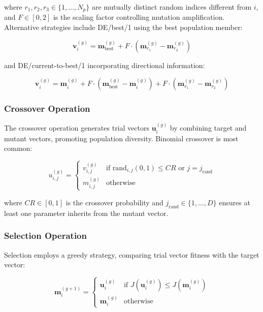 \documentclass[12pt,a4paper]{report}
\begin{document}
where $r_1, r_2, r_3 \in \{1,\ldots,N_p\}$ are mutually distinct random indices different from $i$, and $F \in [0,2]$ is the scaling factor controlling mutation amplification. Alternative strategies include DE/best/1 using the best population member:

\begin{equation}
\mathbf{v}_i^{(g)} = \mathbf{m}_{\text{best}}^{(g)} + F \cdot (\mathbf{m}_{r_1}^{(g)} - \mathbf{m}_{r_2}^{(g)})
\end{equation}

and DE/current-to-best/1 incorporating directional information:

\begin{equation}
\mathbf{v}_i^{(g)} = \mathbf{m}_i^{(g)} + F \cdot (\mathbf{m}_{\text{best}}^{(g)} - \mathbf{m}_i^{(g)}) + F \cdot (\mathbf{m}_{r_1}^{(g)} - \mathbf{m}_{r_2}^{(g)})
\end{equation}

\subsubsection{Crossover Operation}

The crossover operation generates trial vectors $\mathbf{u}_i^{(g)}$ by combining target and mutant vectors, promoting population diversity. Binomial crossover is most common:

\begin{equation}
u_{i,j}^{(g)} = \begin{cases}
v_{i,j}^{(g)} & \text{if } \text{rand}_{i,j}(0,1) \leq CR \text{ or } j = j_{\text{rand}} \\
m_{i,j}^{(g)} & \text{otherwise}
\end{cases}
\end{equation}

where $CR \in [0,1]$ is the crossover probability and $j_{\text{rand}} \in \{1,\ldots,D\}$ ensures at least one parameter inherits from the mutant vector.

\subsubsection{Selection Operation}

Selection employs a greedy strategy, comparing trial vector fitness with the target vector:

\begin{equation}
\mathbf{m}_i^{(g+1)} = \begin{cases}
\mathbf{u}_i^{(g)} & \text{if } J(\mathbf{u}_i^{(g)}) \leq J(\mathbf{m}_i^{(g)}) \\
\mathbf{m}_i^{(g)} & \text{otherwise}
\end{cases}
\end{equation}
\end{document}
